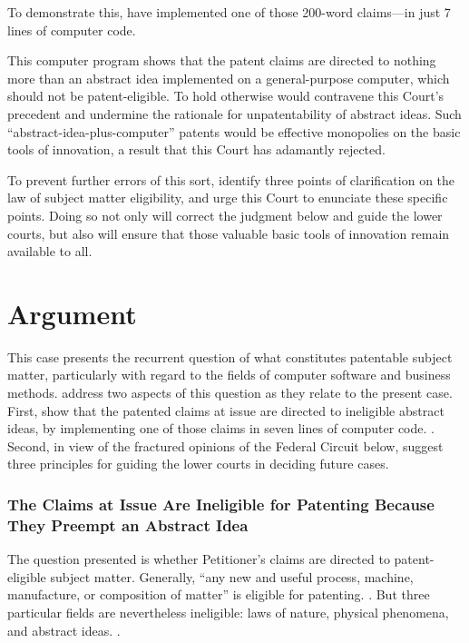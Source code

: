 \documentclass{scotus}
\begin{document}
To demonstrate this, \amici have implemented one of those 200-word
claims---in just 7 lines of computer code.

This computer program shows that the patent
claims are directed to nothing more than an abstract idea implemented on a
general-purpose computer, which should not be patent-eligible.
%
To hold otherwise would contravene this
Court's precedent and undermine the rationale for unpatentability of
abstract ideas. Such ``abstract-idea-plus-computer'' patents would be effective
monopolies on the basic tools of innovation, a result that this
Court has adamantly rejected.

To prevent further errors of this sort, \amici identify three points of
clarification on the law of subject matter eligibility, and urge this Court to
enunciate these specific points. Doing so not
only will correct the judgment below and guide the lower courts, but also will
ensure that those valuable basic tools of innovation remain available to all.

\part{Argument}

This case presents the recurrent question of what constitutes patentable
subject matter, particularly with regard to the fields of computer software and
business methods. \Amici address two aspects of this question as they relate to
the present case. First, \amici show that the patented claims at issue are
directed to ineligible abstract ideas, by
implementing one of those claims in seven lines of computer code. .
Second, in view of the fractured opinions of the Federal Circuit below, \amici
suggest three principles for guiding the lower courts in deciding future cases.



%
%
\section{The Claims at Issue Are Ineligible for Patenting Because They
Preempt an Abstract Idea}

The question presented is whether Petitioner's claims are directed to
patent-eligible subject matter. Generally, ``any new and
useful process, machine, manufacture, or composition of matter'' is eligible for
patenting. . But three particular fields
are nevertheless ineligible: laws of nature, physical phenomena, and abstract
ideas. .
\end{document}
